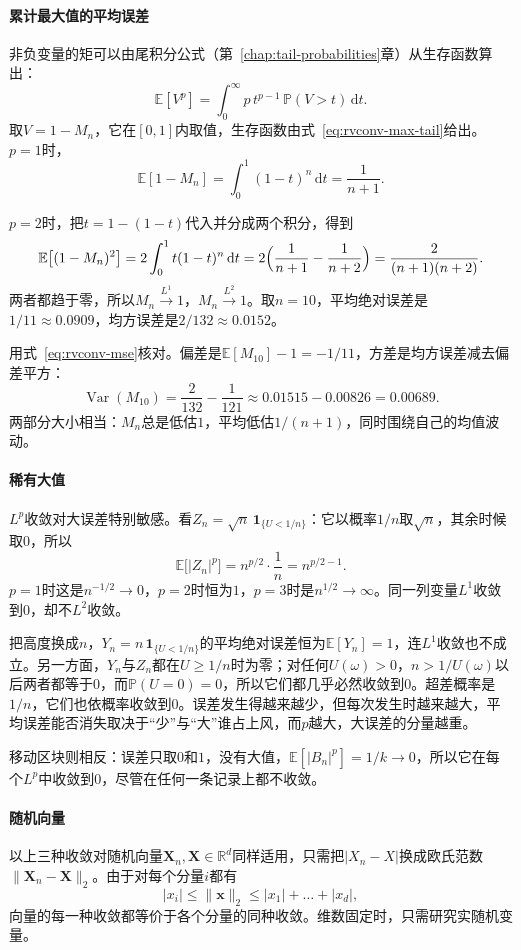 \paragraph{累计最大值的平均误差}
非负变量的矩可以由尾积分公式（第~\ref{chap:tail-probabilities}章）从生存函数算出：
\[
 \mathbb{E}[V^{p}]=\int_0^{\infty}p\,t^{p-1}\,\mathbb{P}(V>t)\,\mathrm{d}t .
\]
取$V=1-M_n$，它在$[0,1]$内取值，生存函数由式~\eqref{eq:rvconv-max-tail}给出。$p=1$时，
\[
 \mathbb{E}[1-M_n]=\int_0^{1}(1-t)^{n}\,\mathrm{d}t=\frac{1}{n+1} .
\]

$p=2$时，把$t=1-(1-t)$代入并分成两个积分，得到
\[
 \mathbb{E}\bigl[(1-M_n)^{2}\bigr]=2\int_0^{1}t(1-t)^{n}\,\mathrm{d}t=2\Bigl(\frac{1}{n+1}-\frac{1}{n+2}\Bigr)=\frac{2}{(n+1)(n+2)} .
\]
两者都趋于零，所以$M_n\xrightarrow{L^{1}}1$，$M_n\xrightarrow{L^{2}}1$。取$n=10$，平均绝对误差是$1/11\approx0.0909$，均方误差是$2/132\approx0.0152$。

用式~\eqref{eq:rvconv-mse}核对。偏差是$\mathbb{E}[M_{10}]-1=-1/11$，方差是均方误差减去偏差平方：
\[
 \operatorname{Var}(M_{10})=\frac{2}{132}-\frac{1}{121}\approx0.01515-0.00826=0.00689 .
\]
两部分大小相当：$M_n$总是低估$1$，平均低估$1/(n+1)$，同时围绕自己的均值波动。

\paragraph{稀有大值}
$L^{p}$收敛对大误差特别敏感。看$Z_n=\sqrt{n}\,\mathbf{1}_{\{U<1/n\}}$：它以概率$1/n$取$\sqrt n$，其余时候取$0$，所以
\begin{equation}
 \mathbb{E}\bigl[\lvert Z_n\rvert^{p}\bigr]=n^{p/2}\cdot\frac1n=n^{p/2-1} .
 \label{eq:rvconv-spike-moments}
\end{equation}
$p=1$时这是$n^{-1/2}\to0$，$p=2$时恒为$1$，$p=3$时是$n^{1/2}\to\infty$。同一列变量$L^{1}$收敛到$0$，却不$L^{2}$收敛。

把高度换成$n$，$Y_n=n\,\mathbf{1}_{\{U<1/n\}}$的平均绝对误差恒为$\mathbb{E}[Y_n]=1$，连$L^{1}$收敛也不成立。另一方面，$Y_n$与$Z_n$都在$U\geq1/n$时为零；对任何$U(\omega)>0$，$n>1/U(\omega)$以后两者都等于$0$，而$\mathbb{P}(U=0)=0$，所以它们都几乎必然收敛到$0$。超差概率是$1/n$，它们也依概率收敛到$0$。误差发生得越来越少，但每次发生时越来越大，平均误差能否消失取决于“少”与“大”谁占上风，而$p$越大，大误差的分量越重。

移动区块则相反：误差只取$0$和$1$，没有大值，$\mathbb{E}[\lvert B_n\rvert^{p}]=1/k\to0$，所以它在每个$L^{p}$中收敛到$0$，尽管在任何一条记录上都不收敛。

\paragraph{随机向量}
以上三种收敛对随机向量$\bm{X}_n,\bm{X}\in\mathbb{R}^{d}$同样适用，只需把$\lvert X_n-X\rvert$换成欧氏范数$\lVert\bm{X}_n-\bm{X}\rVert_2$。由于对每个分量$i$都有
\[
 \lvert x_i\rvert\leq\lVert\bm{x}\rVert_2\leq\lvert x_1\rvert+\dots+\lvert x_d\rvert ,
\]
向量的每一种收敛都等价于各个分量的同种收敛。维数固定时，只需研究实随机变量。
